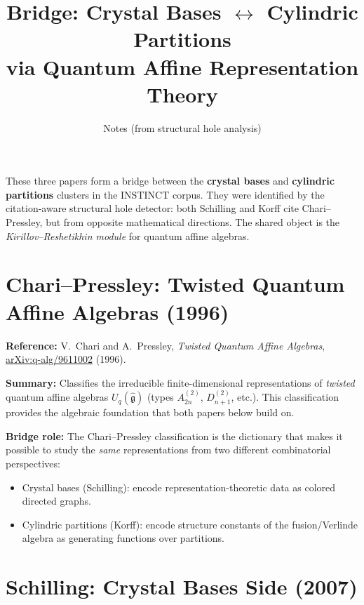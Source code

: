 \documentclass[11pt]{article}
\title{Bridge: Crystal Bases $\longleftrightarrow$ Cylindric Partitions\\[4pt]
\large via Quantum Affine Representation Theory}
\author{Notes (from structural hole analysis)}
\date{}
\begin{document}
\maketitle

\noindent
These three papers form a bridge between the \textbf{crystal bases}
and \textbf{cylindric partitions} clusters in the INSTINCT corpus.
They were identified by the citation-aware structural hole detector:
both Schilling and Korff cite Chari--Pressley, but from opposite
mathematical directions.  The shared object is the
\emph{Kirillov--Reshetikhin module} for quantum affine algebras.

\bigskip

\section{Chari--Pressley: Twisted Quantum Affine Algebras (1996)}

\textbf{Reference:} V.~Chari and A.~Pressley,
\emph{Twisted Quantum Affine Algebras},
\href{https://arxiv.org/abs/q-alg/9611002}{arXiv:q-alg/9611002} (1996).

\medskip
\noindent\textbf{Summary:}
Classifies the irreducible finite-dimensional representations of
\emph{twisted} quantum affine algebras $U_q(\hat{\mathfrak{g}})$
(types $A_{2n}^{(2)}$, $D_{n+1}^{(2)}$, etc.).  This classification
provides the algebraic foundation that both papers below build on.

\medskip
\noindent\textbf{Bridge role:}
The Chari--Pressley classification is the dictionary that makes it
possible to study the \emph{same} representations from two different
combinatorial perspectives:
\begin{itemize}
  \item Crystal bases (Schilling): encode representation-theoretic
    data as colored directed graphs.
  \item Cylindric partitions (Korff): encode structure constants of
    the fusion/Verlinde algebra as generating functions over partitions.
\end{itemize}

\section{Schilling: Crystal Bases Side (2007)}
\end{document}
